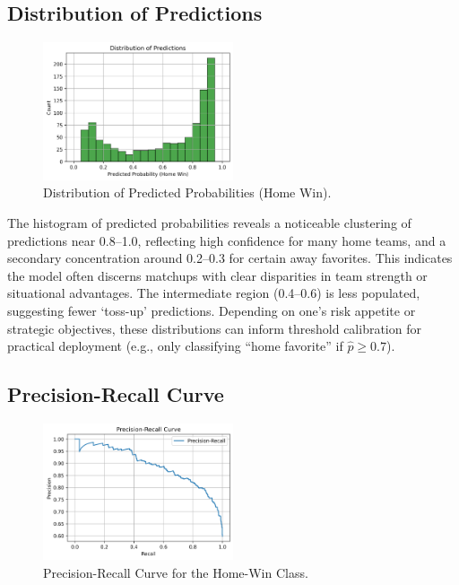 \documentclass[12pt]{article}
\begin{document}
\subsection{Distribution of Predictions}
\begin{figure}[H]
\centering
\includegraphics[width=0.5\textwidth]{graph_histogram.png}
\caption{Distribution of Predicted Probabilities (Home Win).}
\label{fig:distribution_predictions}
\end{figure}

\noindent
The histogram of predicted probabilities reveals a noticeable clustering of predictions near 0.8--1.0, reflecting high confidence for many home teams, and a secondary concentration around 0.2--0.3 for certain away favorites. This indicates the model often discerns matchups with clear disparities in team strength or situational advantages. The intermediate region (0.4--0.6) is less populated, suggesting fewer `toss-up' predictions. Depending on one’s risk appetite or strategic objectives, these distributions can inform threshold calibration for practical deployment (e.g., only classifying “home favorite” if \(\hat{p}\ge 0.7\)).

\subsection{Precision-Recall Curve}
\begin{figure}[H]
\centering
\includegraphics[width=0.5\textwidth]{graph_precision_recall.png}
\caption{Precision-Recall Curve for the Home-Win Class.}
\label{fig:precision_recall}
\end{figure}
\end{document}
